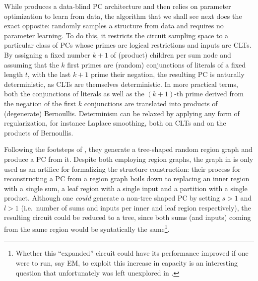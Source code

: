 While  produces a data-blind PC architecture and then relies on parameter
optimization to learn from data, the algorithm that we shall see next does the exact opposite:
 \citep{dimauro21} randomly samples a structure from data and requires no parameter
learning. To do this, it restricts the circuit sampling space to a particular class of PCs whose
primes are logical restrictions and inputs are CLTs. By assigning a fixed number $k+1$ of (product)
children per sum node and assuming that the $k$ first primes are (random) conjunctions of literals
of a fixed length $t$, with the last $k+1$ prime their negation, the resulting PC is naturally
deterministic, as CLTs are themselves deterministic. In more practical terms, both the conjunctions
of literals as well as the $(k+1)$-th prime derived from the negation of the first $k$ conjunctions
are translated into products of (degenerate) Bernoullis. Determinism can be relaxed by applying any
form of regularization, for instance Laplace smoothing, both on CLTs and on the products of
Bernoullis.

Following the footsteps of , they generate a tree-shaped random region graph and
produce a PC from it. Despite both employing region graphs, the graph in \citet{dimauro21} is only
used as an artifice for formalizing the structure construction: their process for reconstructing a
PC from a region graph boils down to replacing an inner region with a single sum, a leaf region
with a single input and a partition with a single product. Although one \emph{could} generate a
non-tree shaped PC by setting $s>1$ and $l>1$ (i.e.\ number of sums and inputs per inner and leaf
region respectively), the resulting circuit could be reduced to a tree, since both sums (and
inputs) coming from the same region would be syntatically the same\footnote{Whether this
``expanded'' circuit could have its performance improved if one were to run, say EM, to exploit
this increase in capacity is an interesting question that unfortunately was left unexplored in
\citet{dimauro21}.}.


